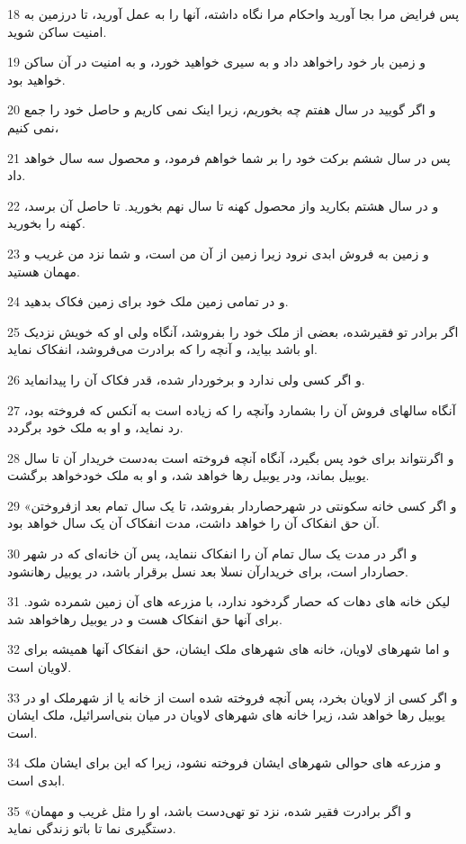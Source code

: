 \par 18 پس فرایض مرا بجا آورید واحکام مرا نگاه داشته، آنها را به عمل آورید، تا درزمین به امنیت ساکن شوید.
\par 19 و زمین بار خود راخواهد داد و به سیری خواهید خورد، و به امنیت در آن ساکن خواهید بود.
\par 20 و اگر گویید در سال هفتم چه بخوریم، زیرا اینک نمی کاریم و حاصل خود را جمع نمی کنیم،
\par 21 پس در سال ششم برکت خود را بر شما خواهم فرمود، و محصول سه سال خواهد داد.
\par 22 و در سال هشتم بکارید واز محصول کهنه تا سال نهم بخورید. تا حاصل آن برسد، کهنه را بخورید.
\par 23 و زمین به فروش ابدی نرود زیرا زمین از آن من است، و شما نزد من غریب و مهمان هستید.
\par 24 و در تمامی زمین ملک خود برای زمین فکاک بدهید.
\par 25 اگر برادر تو فقیرشده، بعضی از ملک خود را بفروشد، آنگاه ولی او که خویش نزدیک او باشد بیاید، و آنچه را که برادرت می‌فروشد، انفکاک نماید.
\par 26 و اگر کسی ولی ندارد و برخوردار شده، قدر فکاک آن را پیدانماید.
\par 27 آنگاه سالهای فروش آن را بشمارد وآنچه را که زیاده است به آنکس که فروخته بود، رد نماید، و او به ملک خود برگردد.
\par 28 و اگرنتواند برای خود پس بگیرد، آنگاه آنچه فروخته است به‌دست خریدار آن تا سال یوبیل بماند، ودر یوبیل رها خواهد شد، و او به ملک خودخواهد برگشت.
\par 29 «و اگر کسی خانه سکونتی در شهرحصاردار بفروشد، تا یک سال تمام بعد ازفروختن آن حق انفکاک آن را خواهد داشت، مدت انفکاک آن یک سال خواهد بود.
\par 30 و اگر در مدت یک سال تمام آن را انفکاک ننماید، پس آن خانه‌ای که در شهر حصاردار است، برای خریدارآن نسلا بعد نسل برقرار باشد، در یوبیل رهانشود.
\par 31 لیکن خانه های دهات که حصار گردخود ندارد، با مزرعه های آن زمین شمرده شود. برای آنها حق انفکاک هست و در یوبیل رهاخواهد شد.
\par 32 و اما شهرهای لاویان، خانه های شهرهای ملک ایشان، حق انفکاک آنها همیشه برای لاویان است.
\par 33 و اگر کسی از لاویان بخرد، پس آنچه فروخته شده است از خانه یا از شهرملک او در یوبیل رها خواهد شد، زیرا خانه های شهرهای لاویان در میان بنی‌اسرائیل، ملک ایشان است.
\par 34 و مزرعه های حوالی شهرهای ایشان فروخته نشود، زیرا که این برای ایشان ملک ابدی است.
\par 35 «و اگر برادرت فقیر شده، نزد تو تهی‌دست باشد، او را مثل غریب و مهمان دستگیری نما تا باتو زندگی نماید.
